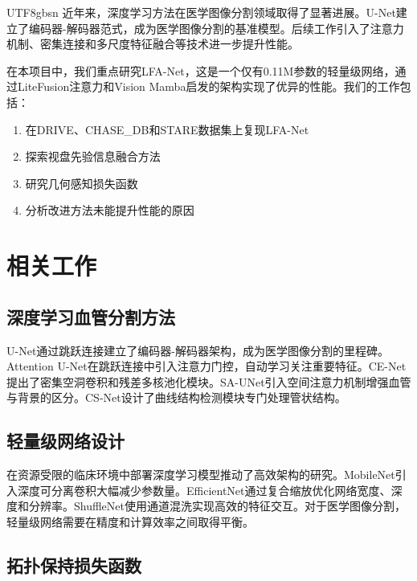 \documentclass[conference]{IEEEtran}
\begin{document}
\begin{CJK}{UTF8}{gbsn}
近年来，深度学习方法在医学图像分割领域取得了显著进展。U-Net\cite{ronneberger2015u}建立了编码器-解码器范式，成为医学图像分割的基准模型。后续工作引入了注意力机制\cite{oktay2018attention}、密集连接\cite{li2018h}和多尺度特征融合\cite{chen2017deeplab}等技术进一步提升性能。

在本项目中，我们重点研究LFA-Net\cite{lfanet2025}，这是一个仅有0.11M参数的轻量级网络，通过LiteFusion注意力和Vision Mamba启发的架构实现了优异的性能。我们的工作包括：
\begin{enumerate}
    \item 在DRIVE、CHASE\_DB和STARE数据集上复现LFA-Net
    \item 探索视盘先验信息融合方法
    \item 研究几何感知损失函数
    \item 分析改进方法未能提升性能的原因
\end{enumerate}

\section{相关工作}

\subsection{深度学习血管分割方法}

U-Net\cite{ronneberger2015u}通过跳跃连接建立了编码器-解码器架构，成为医学图像分割的里程碑。Attention U-Net\cite{oktay2018attention}在跳跃连接中引入注意力门控，自动学习关注重要特征。CE-Net\cite{gu2019net}提出了密集空洞卷积和残差多核池化模块。SA-UNet\cite{guo2021sa}引入空间注意力机制增强血管与背景的区分。CS-Net\cite{mou2019cs}设计了曲线结构检测模块专门处理管状结构。

\subsection{轻量级网络设计}

在资源受限的临床环境中部署深度学习模型推动了高效架构的研究。MobileNet\cite{howard2017mobilenets}引入深度可分离卷积大幅减少参数量。EfficientNet\cite{tan2019efficientnet}通过复合缩放优化网络宽度、深度和分辨率。ShuffleNet\cite{zhang2018shufflenet}使用通道混洗实现高效的特征交互。对于医学图像分割，轻量级网络需要在精度和计算效率之间取得平衡。

\subsection{拓扑保持损失函数}


\end{CJK}
\end{document}
